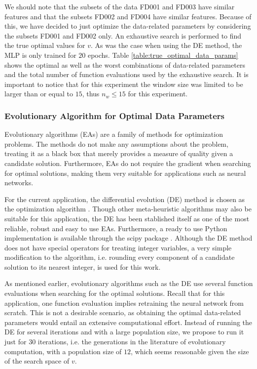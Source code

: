 \documentclass[12pt]{IEEEtran}%
\begin{document}
We should note that the subsets of the data FD001 and FD003 have similar
features and that the subsets FD002 and FD004 have similar features. Because
of this, we have decided to just optimize the data-related parameters by
considering the subsets FD001 and FD002 only. An exhaustive search is
performed to find the true optimal values for $v$. As was the case when using
the DE method, the MLP is only trained for $20$ epochs. Table
\ref{table:true_optimal_data_params} shows the optimal as well as the worst
combinations of data-related parameters and the total number of function
evaluations used by the exhaustive search. It is important to notice that for 
this experiment the window size was limited to be larger than or equal to $15$, 
thus $n_w \leq 15$ for this experiment.

\subsubsection{Evolutionary Algorithm for Optimal Data Parameters}

\label{sec:ea_optimization_process}

Evolutionary algorithms (EAs) are a family of methods for optimization
problems. The methods do not make any assumptions about the problem, treating
it as a black box that merely provides a measure of quality given a candidate
solution. Furthermore, EAs do not require the gradient when searching for
optimal solutions, making them very suitable for applications such as neural networks.

For the current application, the differential evolution (DE) method is chosen
as the optimization algorithm \cite{Storn1997}. Though other meta-heuristic
algorithms may also be suitable for this application, the DE has been
stablished itself as one of the most reliable, robust and easy to use EAs.
Furthermore, a ready to use Python implementation is available through the
scipy package \cite{scipy}. Although the DE method does not have special
operators for treating integer variables, a very simple modification to the
algorithm, i.e. rounding every component of a candidate solution to its
nearest integer, is used for this work.

As mentioned earlier, evolutionary algorithms such as the DE use several
function evaluations when searching for the optimal solutions. Recall that for
this application, one function evaluation implies retraining the neural
network from scratch. This is not a desirable scenario, as obtaining the
optimal data-related parameters would entail an extensive computational
effort. Instead of running the DE for several iterations and with a large
population size, we propose to run it just for $30$ iterations, i.e. the
generations in the literature of evolutionary computation, with a population
size of $12$, which seems reasonable given the size of the search space of $v$.
\end{document}
